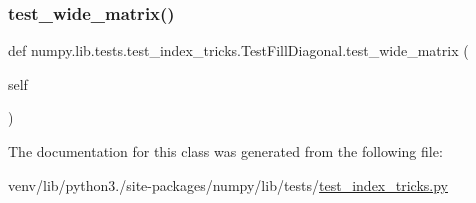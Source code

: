 \subsubsection{\texorpdfstring{test\+\_\+wide\+\_\+matrix()}{test\_wide\_matrix()}}
{\footnotesize\ttfamily def numpy.\+lib.\+tests.\+test\+\_\+index\+\_\+tricks.\+Test\+Fill\+Diagonal.\+test\+\_\+wide\+\_\+matrix (\begin{DoxyParamCaption}\item[{}]{self }\end{DoxyParamCaption})}



The documentation for this class was generated from the following file\+:\begin{DoxyCompactItemize}
\item 
venv/lib/python3./site-\/packages/numpy/lib/tests/\hyperlink{test__index__tricks_8py}{test\+\_\+index\+\_\+tricks.\+py}\end{DoxyCompactItemize}
